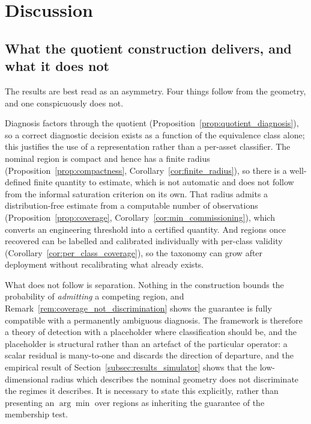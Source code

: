 \documentclass[a4paper]{cas-sc}
\begin{document}
\section{Discussion}
\label{sec:discussion}

\subsection{What the quotient construction delivers, and what it does not}
\label{subsec:disc_yield}

The results are best read as an asymmetry. Four things follow from the
geometry, and one conspicuously does not.

Diagnosis factors through the quotient
(Proposition~\ref{prop:quotient_diagnosis}), so a correct diagnostic decision
exists as a function of the equivalence class alone; this justifies
the use of a representation rather than a per-asset classifier. The
nominal region is compact and hence has a finite radius
(Proposition~\ref{prop:compactness},
Corollary~\ref{cor:finite_radius}), so there is a well-defined finite quantity
to estimate, which is not automatic and does not follow from the informal
saturation criterion on its own. That radius admits a distribution-free
estimate from a computable number of observations
(Proposition~\ref{prop:coverage},
Corollary~\ref{cor:min_commissioning}), which converts an engineering
threshold into a certified quantity. And regions once recovered can be
labelled and calibrated individually with per-class validity
(Corollary~\ref{cor:per_class_coverage}), so the taxonomy can grow after
deployment without recalibrating what already exists.

What does not follow is separation. Nothing in the construction bounds the
probability of \emph{admitting} a competing region, and
Remark~\ref{rem:coverage_not_discrimination} shows the guarantee is fully
compatible with a permanently ambiguous diagnosis. The framework is therefore
a theory of detection with a placeholder where classification should be, and
the placeholder is structural rather than an artefact of the particular
operator: a scalar residual is many-to-one and discards the direction of
departure, and the empirical result of
Section~\ref{subsec:results_simulator} shows that the low-dimensional radius
which describes the nominal geometry does not discriminate the regimes it
describes. It is necessary to state this explicitly, rather than presenting an
\(\arg\min\) over regions as inheriting the guarantee of the membership test.
\end{document}
